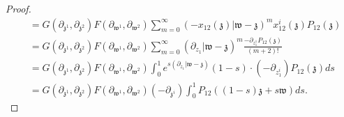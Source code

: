 \documentclass[11pt]{amsart}
\theoremstyle{definition}
\theoremstyle{remark}
\numberwithin{equation}{section}
\begin{document}
\begin{proof}
\begin{align*}
    &=  G(\partial_{\mathfrak{z}^1},\partial_{\mathfrak{z}^2})F(\partial_{\mathfrak{w}^1},\partial_{\mathfrak{w}^2})  \sum_{m=0}^{\infty}(-x_{12}(\mathfrak{z})|\mathfrak{w}-\mathfrak{z})^mx^i_{12}(\mathfrak{z})P_{12}(\mathfrak{z}) \\
    &=G(\partial_{\mathfrak{z}^1},\partial_{\mathfrak{z}^2})F(\partial_{\mathfrak{w}^1},\partial_{\mathfrak{w}^2}) \sum_{m=0}^{\infty}(\partial_{z_1}|\mathfrak{w}-\mathfrak{z})^m\frac{-\partial_{z^1_1}P_{12}(\mathfrak{z})}{(m+2)!}\\
    &=G(\partial_{\mathfrak{z}^1},\partial_{\mathfrak{z}^2})F(\partial_{\mathfrak{w}^1},\partial_{\mathfrak{w}^2}) \int^1_0e^{s(\partial_{z_1}|\mathfrak{w}-\mathfrak{z})}(1-s)\cdot (-\partial_{z^{i}_1})P_{12}(\mathfrak{z})ds\\
    &=G(\partial_{\mathfrak{z}^1},\partial_{\mathfrak{z}^2})F(\partial_{\mathfrak{w}^1},\partial_{\mathfrak{w}^2})(-\partial_{\mathfrak{z}^i})\int^1_0P_{12}\left((1-s)\mathfrak{z}+s\mathfrak{w}\right)ds.
  \end{align*}
  \fi
\end{proof}
\end{document}
